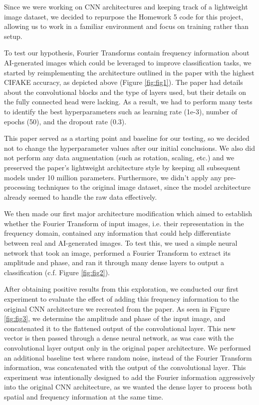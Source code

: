 Since we were working on CNN architectures and keeping track of a lightweight image dataset, we decided to repurpose the Homework 5 code for this project, allowing us to work in a familiar environment and focus on training rather than setup.

To test our hypothesis, Fourier Transforms contain frequency information about AI-generated images which could be leveraged to improve classification tasks, we started by reimplementing the architecture outlined in the paper with the highest CIFAKE accuracy, as depicted above (Figure \ref{fig:fig1}). The paper had details about the convolutional blocks and the type of layers used, but their details on the fully connected head were lacking. As a result, we had to perform many tests to identify the best hyperparameters such as learning rate (1e-3), number of epochs (50), and the dropout rate (0.3).

This paper served as a starting point and baseline for our testing, so we decided not to change the hyperparameter values after our initial conclusions. We also did not perform any data augmentation (such as rotation, scaling, etc.) and we preserved the paper’s lightweight architecture style by keeping all subsequent models under 10 million parameters. Furthermore, we didn’t apply any pre-processing techniques to the original image dataset, since the model architecture already seemed to handle the raw data effectively.

We then made our first major architecture modification which aimed to establish whether the Fourier Transform of input images, i.e. their representation in the frequency domain, contained any information that could help differentiate between real and AI-generated images. To test this, we used a simple neural network that took an image, performed a Fourier Transform to extract its amplitude and phase, and ran it through many dense layers to output a classification (c.f. Figure \ref{fig:fig2}).

After obtaining positive results from this exploration, we conducted our first experiment to evaluate the effect of adding this frequency information to the original CNN architecture we recreated from the paper. As seen in Figure \ref{fig:fig3}, we determine the amplitude and phase of the input image, and concatenated it to the flattened output of the convolutional layer. This new vector is then passed through a dense neural network, as was case with the convolutional layer output only in the original paper architecture. We performed an additional baseline test where random noise, instead of the Fourier Transform information, was concatenated with the output of the convolutional layer. This experiment was intentionally designed to add the Fourier information aggressively into the original CNN architecture, as we wanted the dense layer to process both spatial and frequency information at the same time.

